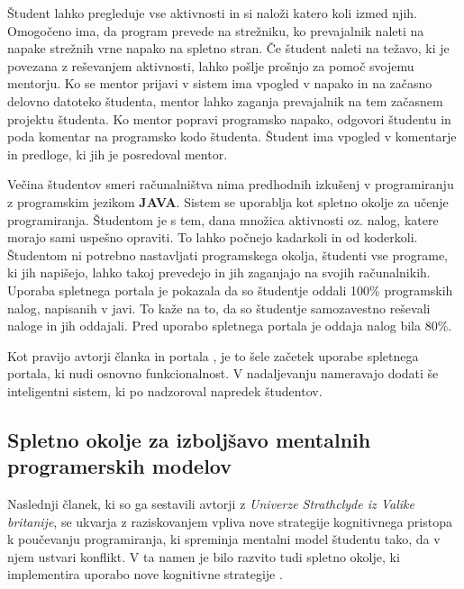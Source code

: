 Študent lahko pregleduje vse aktivnosti in si naloži katero koli izmed
njih. Omogočeno ima, da program prevede na strežniku, ko prevajalnik
naleti na napake strežnih vrne napako na spletno stran. Če študent
naleti na težavo, ki je povezana z reševanjem aktivnosti, lahko pošlje
prošnjo za pomoč svojemu mentorju. Ko se mentor prijavi v sistem ima
vpogled v napako in na začasno delovno datoteko študenta, mentor lahko
zaganja prevajalnik na tem začasnem projektu študenta. Ko mentor
popravi programsko napako, odgovori študentu in poda komentar na
programsko kodo študenta. Študent ima vpogled v komentarje in
predloge, ki jih je posredoval mentor.


Večina študentov smeri računalništva nima predhodnih izkušenj v
programiranju z programskim jezikom \textbf{JAVA}. Sistem se uporablja
kot spletno okolje za učenje programiranja. Študentom je s tem, dana
množica aktivnosti oz. nalog, katere morajo sami uspešno opraviti. To
lahko počnejo kadarkoli in od koderkoli. Študentom ni potrebno
nastavljati programskega okolja, študenti vse programe, ki jih
napišejo, lahko takoj prevedejo in jih zaganjajo na svojih
računalnikih. Uporaba spletnega portala je pokazala da so študentje
oddali 100\% programskih nalog, napisanih v javi. To kaže na to, da so
študentje samozavestno reševali naloge in jih oddajali. Pred uporabo
spletnega portala je oddaja nalog bila 80\%.

Kot pravijo avtorji članka in portala \cite{ITaLCP_DistanceEdu}, je to
šele začetek uporabe spletnega portala, ki nudi osnovno
funkcionalnost. V nadaljevanju nameravajo dodati še inteligentni
sistem, ki po nadzoroval napredek študentov.


\subsection{Spletno okolje za izboljšavo mentalnih programerskih
  modelov}
\label{sec:mental_models}

Naslednji članek, ki so ga sestavili avtorji z \emph{Univerze Strathclyde iz
Valike britanije}, se ukvarja z raziskovanjem vpliva nove strategije
kognitivnega pristopa k poučevanju programiranja, ki spreminja
mentalni model študentu tako, da v njem ustvari konflikt. V ta namen
je bilo razvito tudi spletno okolje, ki implementira uporabo nove
kognitivne strategije \cite{mentalModels}.

